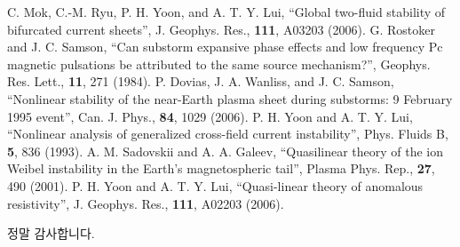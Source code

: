 \documentclass{gshs_thesis}
\begin{document}
\begin{thebibliography}{99}
\begin{onehalfspace}
C. Mok, C.-M. Ryu, P. H. Yoon, and A. T. Y. Lui, ``Global two-fluid stability of bifurcated current sheets'', J. Geophys. Res., {\bf 111}, A03203 (2006).
 G. Rostoker and J. C. Samson, ``Can substorm expansive phase effects and low frequency Pc magnetic pulsations be attributed to the same source mechanism?'', Geophys. Res. Lett., {\bf 11}, 271 (1984).
 P. Dovias, J. A. Wanliss, and J. C. Samson, ``Nonlinear stability of the near-Earth plasma sheet during substorms: 9 February 1995 event'', Can. J. Phys., {\bf 84}, 1029 (2006).
 P. H. Yoon and A. T. Y. Lui, ``Nonlinear analysis of generalized cross-field current instability'', Phys. Fluids B, {\bf 5}, 836 (1993).
 A. M. Sadovskii and A. A. Galeev, ``Quasilinear theory of the ion Weibel instability in the Earth's magnetospheric tail'', Plasma Phys. Rep., {\bf 27}, 490 (2001).
 P. H. Yoon and A. T. Y. Lui, ``Quasi-linear theory of anomalous resistivity'', J. Geophys. Res., {\bf 111}, A02203 (2006).

\end{onehalfspace}\end{thebibliography}


\begin{acknowledgements}
정말 감사합니다.
\end{acknowledgements}
\end{document}
